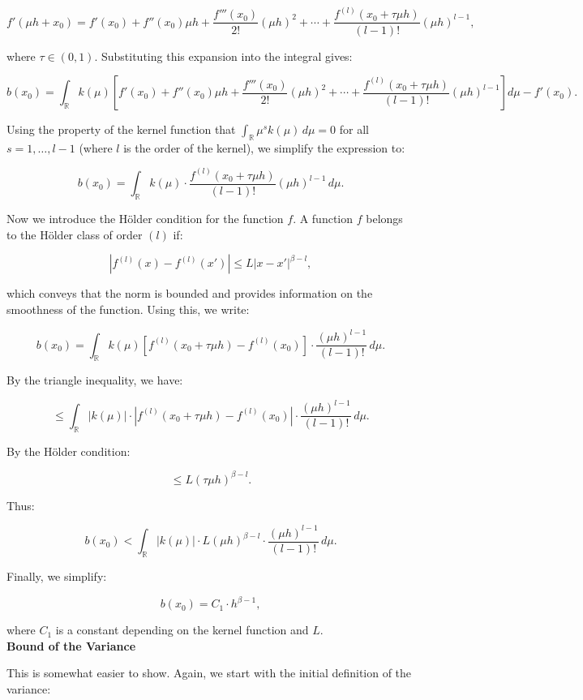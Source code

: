 \documentclass{article}
\begin{document}
\[
f'(\mu h + x_0) = f'(x_0) + f''(x_0) \mu h + \frac{f'''(x_0)}{2!} (\mu h)^2 + \cdots + \frac{f^{(l)}(x_0 + \tau \mu h)}{(l-1)!} (\mu h)^{l-1},
\]

where \(\tau \in (0, 1)\). Substituting this expansion into the integral gives:

\[
b(x_0) = \int_{\mathbb{R}} k(\mu) \left[f'(x_0) + f''(x_0) \mu h + \frac{f'''(x_0)}{2!} (\mu h)^2 + \cdots + \frac{f^{(l)}(x_0 + \tau \mu h)}{(l-1)!} (\mu h)^{l-1} \right] d\mu - f'(x_0).
\]

Using the property of the kernel function that \(\int_{\mathbb{R}} \mu^s k(\mu) \, d\mu = 0\) for all \(s = 1, \dots, l-1\) (where \(l\) is the order of the kernel), we simplify the expression to:

\[
b(x_0) = \int_{\mathbb{R}} k(\mu) \cdot \frac{f^{(l)}(x_0 + \tau \mu h)}{(l-1)!} (\mu h)^{l-1} \, d\mu.
\]

Now we introduce the Hölder condition for the function \(f\). A function \(f\) belongs to the Hölder class of order \((l)\) if:

\[
|f^{(l)}(x) - f^{(l)}(x')| \leq L |x - x'|^{\beta - l},
\]

which conveys that the norm is bounded and provides information on the smoothness of the function. Using this, we write:

\[
b(x_0) = \int_{\mathbb{R}} k(\mu) \left[f^{(l)}(x_0 + \tau \mu h) - f^{(l)}(x_0)\right] \cdot \frac{(\mu h)^{l-1}}{(l-1)!} \, d\mu.
\]

By the triangle inequality, we have:

\[
\leq \int_{\mathbb{R}} |k(\mu)| \cdot \left|f^{(l)}(x_0 + \tau \mu h) - f^{(l)}(x_0)\right| \cdot \frac{(\mu h)^{l-1}}{(l-1)!} \, d\mu.
\]

By the Hölder condition:

\[
\leq L (\tau \mu h)^{\beta - l}.
\]

Thus:

\[
b(x_0) < \int_{\mathbb{R}} |k(\mu)| \cdot L (\mu h)^{\beta - l} \cdot \frac{(\mu h)^{l-1}}{(l-1)!} \, d\mu.
\]

Finally, we simplify:

\[
b(x_0) = C_1 \cdot h^{\beta - 1},
\]

where \(C_1\) is a constant depending on the kernel function and \(L\). \\



\textbf{Bound of the Variance}

This is somewhat easier to show. Again, we start with the initial definition of the variance:
\end{document}
